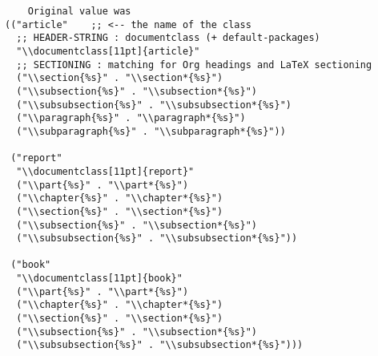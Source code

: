 \documentclass[dvipdfmx,12pt]{jsarticle}
\begin{document}
\lstset{language=Lisp,label= ,caption= ,numbers=none}
\begin{lstlisting}
    Original value was
(("article"    ;; <-- the name of the class
  ;; HEADER-STRING : documentclass (+ default-packages)
  "\\documentclass[11pt]{article}"
  ;; SECTIONING : matching for Org headings and LaTeX sectioning
  ("\\section{%s}" . "\\section*{%s}")
  ("\\subsection{%s}" . "\\subsection*{%s}")
  ("\\subsubsection{%s}" . "\\subsubsection*{%s}")
  ("\\paragraph{%s}" . "\\paragraph*{%s}")
  ("\\subparagraph{%s}" . "\\subparagraph*{%s}"))

 ("report"
  "\\documentclass[11pt]{report}"
  ("\\part{%s}" . "\\part*{%s}")
  ("\\chapter{%s}" . "\\chapter*{%s}")
  ("\\section{%s}" . "\\section*{%s}")
  ("\\subsection{%s}" . "\\subsection*{%s}")
  ("\\subsubsection{%s}" . "\\subsubsection*{%s}"))

 ("book"
  "\\documentclass[11pt]{book}"
  ("\\part{%s}" . "\\part*{%s}")
  ("\\chapter{%s}" . "\\chapter*{%s}")
  ("\\section{%s}" . "\\section*{%s}")
  ("\\subsection{%s}" . "\\subsection*{%s}")
  ("\\subsubsection{%s}" . "\\subsubsection*{%s}")))
\end{lstlisting}
\end{document}
